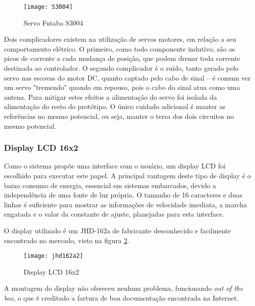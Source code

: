 \documentclass[a4paper,11pt]{article}
\begin{document}
\begin{figure}[ht]
 \begin{center}
  \texttt{[image: S3004]}
 \end{center}
 \caption{Servo Futaba S3004}
 \label{fig: servo}
\end{figure}

Dois complicadores existem na utilização de servos motores\cite{servo}, em
relação a seu comportamento elétrico. O primeiro, como todo componente indutivo,
são os picos de corrente a cada mudança de posição, que podem drenar toda
corrente destinada ao controlador. O segundo complicador é o ruído, tanto gerado
pelo servo nas escovas do motor DC, quanto captado pelo cabo de sinal -- é comum
ver um servo "tremendo" quando em repouso, pois o cabo do sinal atua como uma
antena. Para mitigar estes efeitos a alimentação do servo foi isolada da
alimentação do resto do protótipo. O único cuidado adicional é manter as
referências no mesmo potencial, ou seja, manter o terra dos dois circuitos no
mesmo potencial.

\subsubsection{Display LCD 16x2}
\label{sec:lcd}

Como o sistema propõe uma interface com o usuário, um display LCD foi escolhido
para executar este papel. A principal vantagem deste tipo de display é o baixo
consumo de energia, essencial em sistemas embarcados, devido a independência de
uma fonte de luz própria. O tamanho de 16 caracteres e duas linhas é suficiente
para mostrar as informações de velocidade imediata, a marcha engatada e o valor
da constante de ajuste, planejadas para esta interface.

O display utilizado é um JHD-162a\cite{lcd} de fabricante desconhecido e
facilmente encontrado no mercado, visto na figura \ref{fig:lcd}.
\begin{figure}[ht]
\begin{center}
 \texttt{[image: jhd162a2]}
\end{center}
  \caption{Display LCD 16x2}
  \label{fig:lcd}
\end{figure}

A montagem do display não ofereceu nenhum problema, funcionando \textit{out of
the box}, o que é creditado a fartura de boa documentação encontrada na
Internet.
\end{document}
